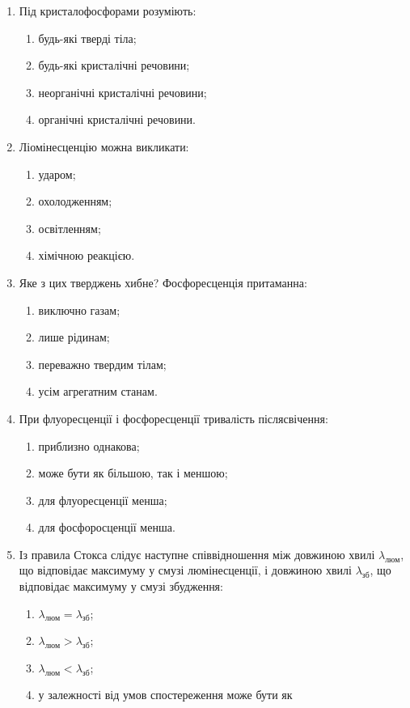 \documentclass[twocolumn]{el-author}
\begin{document}
\begin{enumerate}
	\item Під кристалофосфорами розуміють:
	\begin{enumerate}
		\item будь-які тверді тіла;
		\item будь-які кристалічні речовини;
		\item неорганічні кристалічні речовини;
		\item органічні кристалічні речовини.
	\end{enumerate}
	\item Ліомінесценцію можна викликати:
	\begin{enumerate}
		\item ударом;
		\item охолодженням;
		\item освітленням;
		\item хімічною реакцією.
	\end{enumerate}
	\item Яке з цих тверджень хибне? Фосфоресценція притаманна:
	\begin{enumerate}
		\item виключно газам;
		\item лише рідинам;
		\item переважно твердим тілам;
		\item усім агрегатним станам.
	\end{enumerate}
	\item При флуоресценції і фосфоресценції тривалість післясвічення:
	\begin{enumerate}
		\item приблизно однакова;
		\item може бути як більшою, так і меншою;
		\item для флуоресценції менша;
		\item для фосфоросценції менша.
	\end{enumerate}
	\item Із правила Стокса слідує наступне співвідношення між довжиною хвилі
	$\lambda_{люм}$, що відповідає максимуму у смузі люмінесценції, і довжиною хвилі
	$\lambda_{зб}$, що відповідає максимуму у смузі збудження:
	\begin{enumerate}
		\item $\lambda_{люм} = \lambda_{зб}$;
		\item $\lambda_{люм} > \lambda_{зб}$;
		\item $\lambda_{люм} < \lambda_{зб}$;
		\item у залежності від умов спостереження може бути як 

\end{enumerate}
\end{enumerate}
\end{document}

